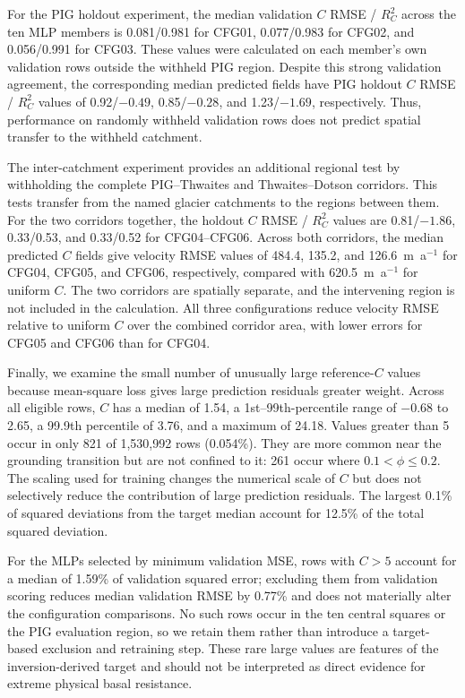 \documentclass[review,jog]{igs}
\begin{document}
For the PIG holdout experiment, the median validation $C$ RMSE /
$R_C^2$ across the ten MLP members is 0.081/0.981 for CFG01,
0.077/0.983 for CFG02, and 0.056/0.991 for CFG03. These values
were calculated on each member's own validation rows outside the
withheld PIG region. Despite this strong validation agreement, the
corresponding median predicted fields have PIG holdout $C$ RMSE /
$R_C^2$ values of 0.92/$-0.49$, 0.85/$-0.28$, and
1.23/$-1.69$, respectively. Thus, performance on randomly withheld
validation rows does not predict spatial transfer to the withheld
catchment. 

The inter-catchment experiment provides an additional regional test by withholding the complete PIG--Thwaites and Thwaites--Dotson corridors. This tests transfer from the named glacier catchments to the regions between them. For the two corridors together, the holdout $C$ RMSE / $R_C^2$ values are 0.81/$-1.86$, 0.33/0.53, and 0.33/0.52 for CFG04--CFG06. Across both corridors, the median predicted $C$ fields give velocity RMSE values of 484.4, 135.2, and 126.6~m~a$^{-1}$ for CFG04, CFG05, and CFG06, respectively, compared with 620.5~m~a$^{-1}$ for uniform $C$. The two corridors are spatially separate, and the intervening region is not included in the calculation. All three configurations reduce velocity RMSE relative to uniform $C$ over the combined corridor area, with lower errors for CFG05 and CFG06 than for CFG04.

Finally, we examine the small number of unusually large reference-$C$ values
because mean-square loss gives large prediction residuals greater weight.
Across all eligible rows, $C$ has a median of 1.54, a
1st--99th-percentile range of $-0.68$ to 2.65, a 99.9th percentile of
3.76, and a maximum of 24.18. Values greater than 5 occur in only 821 of
1,530,992 rows (0.054\%). They are more common near the grounding
transition but are not confined to it: 261 occur where
$0.1<\phi\leq0.2$. The scaling used for training changes the numerical
scale of $C$ but does not selectively reduce the contribution of large
prediction residuals. The largest 0.1\% of squared deviations from the
target median account for 12.5\% of the total squared deviation.

For the MLPs selected by minimum validation MSE, rows with $C>5$ account for a median of 1.59\% of validation squared error; excluding them from validation scoring reduces median validation RMSE by 0.77\% and does not materially alter the configuration comparisons. No such rows occur in the ten central squares or the PIG evaluation region, so we retain them rather than introduce a target-based exclusion and retraining step. These rare large values are features of the inversion-derived target and should not be interpreted as direct evidence for extreme physical basal resistance.
\end{document}
